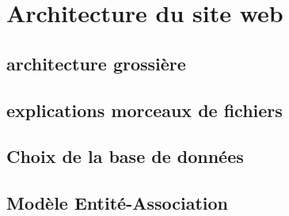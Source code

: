 \chapter{Architecture du site web}

    \section{architecture grossière}

    \section{explications morceaux de fichiers}

    
    \section{Choix de la base de données}

        
    \section{Modèle Entité-Association}


